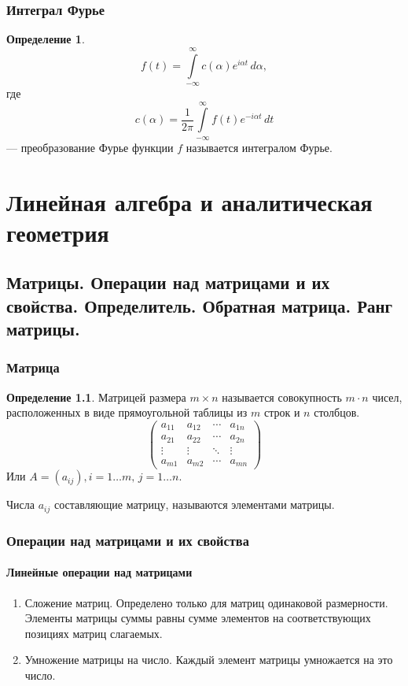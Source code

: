 \documentclass[12pt]{report}
\theoremstyle{definition}
\newtheorem{definition}[theorem]{Определение}
\begin{document}
\subsection{Интеграл Фурье}
\begin{definition}
$$
f(t) = \int\limits_{-\infty}^{\infty} c(\alpha) e^{i \alpha t}\, d\alpha,
$$
где
$$
c(\alpha) = \dfrac{1}{2 \pi}\int\limits_{-\infty}^{\infty} f(t) e^{-i\alpha t} \, dt
$$
--- преобразование Фурье функции $f$ называется интегралом Фурье.
\end{definition}

\chapter{Линейная алгебра и аналитическая геометрия}
\section
{
  Матрицы. Операции над матрицами и их свойства. 
  Определитель. Обратная матрица. Ранг матрицы.
}
\subsection{Матрица}
\begin{definition}
Матрицей размера $m \times n$ называется совокупность
$m \cdot n$ чисел, расположенных в виде прямоугольной
таблицы из $m$ строк и $n$ столбцов.
$$
\begin{pmatrix} a_{11} & a_{12} & \cdots & a_{1n}
\\a_{21} & a_{22} & \cdots & a_{2n}
\\ \vdots & \vdots & \ddots & \vdots
\\ a_{m1} & a_{m2} & \cdots & a_{mn}
\end{pmatrix}
$$
Или $A = (a_{ij}), i = 1 \dots m, \, j = 1 \dots n$.
\end{definition}

Числа $a_{ij}$ составляющие матрицу, называются элементами матрицы.

\subsection{Операции над матрицами и их свойства}
\subsubsection{Линейные операции над матрицами}
\begin{enumerate}
\item Сложение матриц. Определено только для матриц одинаковой размерности.
  Элементы матрицы суммы равны сумме элементов на соответствующих позициях
  матриц слагаемых.
\item Умножение матрицы на число. Каждый элемент матрицы умножается на это число.
\end{enumerate}
\end{document}

